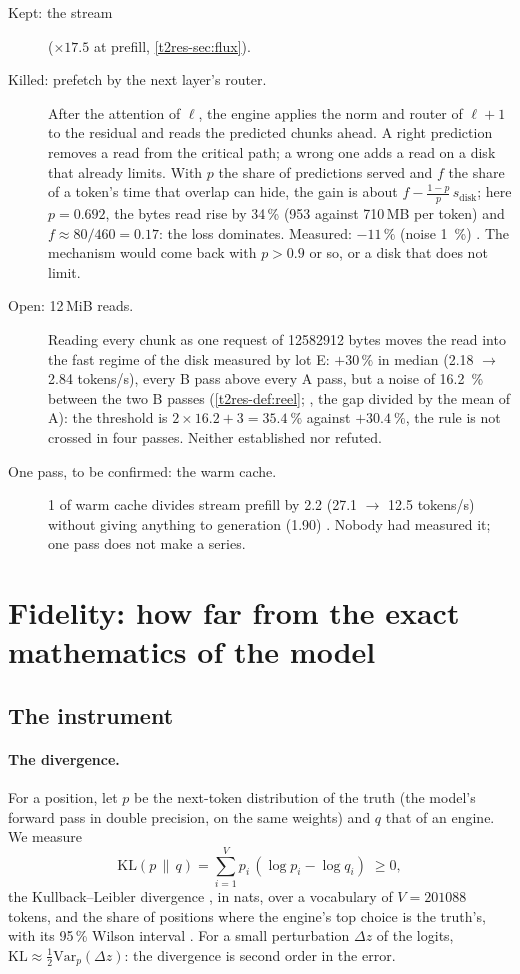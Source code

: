 \begin{description}
\item[Kept: the stream] ($\times 17.5$ at prefill, \cref{t2res-sec:flux}).
\item[Killed: prefetch by the next layer's router.] After the attention of $\ell$, the engine applies the norm and router of $\ell+1$ to the residual and reads the predicted chunks ahead. A right prediction removes a read from the critical path; a wrong one adds a read on a disk that already limits. With $p$ the share of predictions served and $f$ the share of a token's time that overlap can hide, the gain is about $f - \frac{1-p}{p}\,s_{\text{disk}}$; here $p = 0.692$, the bytes read rise by \num{34}\,\% (953 against 710\,MB per token) and $f \approx 80/460 = 0.17$: the loss dominates. Measured: $-11\,\%$ (noise \SI{1}{\percent}) \mes. The mechanism would come back with $p > 0.9$ or so, or a disk that does not limit.
\item[Open: 12\,MiB reads.] Reading every chunk as one request of \num{12582912} bytes moves the read into the fast regime of the disk measured by lot E: $+30\,\%$ in median (\num{2.18} $\to$ \num{2.84} tokens/s), every B pass above every A pass, but a noise of \SI{16.2}{\percent} between the two B passes (\cref{t2res-def:reel}; , the gap divided by the mean of A): the threshold is $2 \times 16.2 + 3 = \SI{35.4}{\percent}$ against $+\SI{30.4}{\percent}$, the rule is not crossed in four passes. Neither established nor refuted.
\item[One pass, to be confirmed: the warm cache.] \SI{1}{\Go} of warm cache divides stream prefill by \num{2.2} (\num{27.1} $\to$ \num{12.5} tokens/s) without giving anything to generation (\num{1.90}) \mes. Nobody had measured it; one pass does not make a series.
\end{description}

\section{Fidelity: how far from the exact mathematics of the model}\label{t2res-sec:fidelite}

\subsection{The instrument}

\paragraph{The divergence.} For a position, let $p$ be the next-token distribution of the truth (the model's forward pass in double precision, on the same weights) and $q$ that of an engine. We measure
\[
\mathrm{KL}(p \,\|\, q) = \sum_{i=1}^{V} p_i \,(\log p_i - \log q_i) \;\ge 0,
\]
the Kullback--Leibler divergence \cite{kullback1951}, in nats, over a vocabulary of $V = \num{201088}$ tokens, and the share of positions where the engine's top choice is the truth's, with its 95\,\% Wilson interval \cite{wilson1927}. For a small perturbation $\Delta z$ of the logits, $\mathrm{KL} \approx \tfrac12 \mathrm{Var}_p(\Delta z)$: the divergence is second order in the error.

